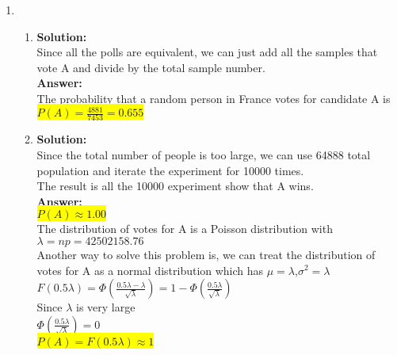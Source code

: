\documentclass{article}
\newcommand{\myansw}{\textbf{Answer:}\\}
\newcommand{\mysolu}{\textbf{Solution:}\\}
\begin{document}
\begin{enumerate}
\begin{enumerate}
		
	\end{enumerate}
	\item
	\begin{enumerate}
		\item
		\mysolu
		Since all the polls are equivalent, we can just add all the samples that vote A and divide by the total sample number.\\
		\myansw
		The probability that a random person in France votes for candidate A is\\
		\colorbox{yellow}{$P(A) = \frac{4881}{7453}=0.655$}\\
		\item
		\mysolu
		Since the total number of people is too large, we can use 64888 total population and iterate the experiment for 10000 times.\\
		The result is all the 10000 experiment show that A wins.\\
		\myansw
		\colorbox{yellow}{$P(A) \approx 1.00$}\\
		The distribution of votes for A is a Poisson distribution with $\lambda = np = 42502158.76$\\
		Another way to solve this problem is, we can treat the distribution of votes for A as a normal distribution which has $\mu = \lambda$,$\sigma^2 = \lambda$ \\
		$F(0.5\lambda) = \Phi(\frac{0.5 \lambda - \lambda}{\sqrt{\lambda}}) = 1 - \Phi(\frac{0.5 \lambda}{\sqrt{\lambda}})$\\
		Since $\lambda$ is very large\\
		$\Phi(\frac{0.5 \lambda}{\sqrt{\lambda}})=0$\\
		\colorbox{yellow}{$P(A)=F(0.5\lambda) \approx 1$}\\
	\end{enumerate}

\end{enumerate}

\newpage
\end{document}
